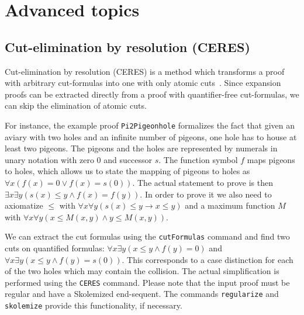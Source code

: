 \documentclass[a4paper,11pt]{book}
\newcommand{\impl}{\to} %
\renewcommand{\land}{\wedge}
\renewcommand{\lor}{\vee}
\begin{document}
\chapter{Advanced topics}


\section{Cut-elimination by resolution (CERES)}\label{sec:ceres}

Cut-elimination by resolution (CERES) is a method which transforms a
proof with arbitrary cut-formulas into one with only atomic cuts~\cite{Baaz00CutElimination,Baaz2011}. Since
expansion proofs can be extracted directly from a proof with quantifier-free
cut-formulas, we can skip the elimination of atomic cuts.

For instance, the example proof \texttt{Pi2Pigeonhole} formalizes
the fact that given an aviary with two holes and an infinite number
of pigeons, one hole has to house at least two pigeons. The pigeons and
the holes are represented by numerals in unary notation with zero $0$ and
successor $s$. The function symbol $f$ maps pigeons to holes, which allows us
to state the mapping of pigeons to holes as
$\forall x (f(x) = 0 \lor f(x) = s(0))$. The actual statement to prove is then
$\exists x \exists y (s(x) \leq y \land f(x) = f(y))$. In order to prove it
we also need to axiomatize $\leq$ with
$\forall x \forall y (s(x) \leq y \impl x \leq y)$ 
and a maximum function $M$ with $\forall x \forall y (x \leq M(x,y) \land y\leq M(x,y))$.

We can extract the cut formulas using the \texttt{cutFormulas} command and find two
cuts on quantified formulas: $\forall x \exists y (x \leq y \land f(y) = 0)$
and $\forall x \exists y (x \leq y \land f(y) = s(0))$.
This corresponds to a case distinction for each of the two holes which may contain the collision.
The actual simplification is performed using the \texttt{CERES} command. Please note
that the input proof must be regular and have a Skolemized end-sequent.
The commands \texttt{regularize} and \texttt{skolemize} provide this functionality,
if necessary.
\end{document}
